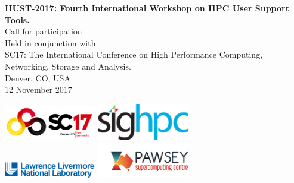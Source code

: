 \documentclass[11pt,a4paper]{article}
\begin{document}
\begin{titlepage}
\begin{center}
\vspace{35mm}
{\bf {\selectfont \fontsize{30}{35}\selectfont HUST-2017:  Fourth International Workshop on HPC User Support Tools.}}\\
\vspace{20mm}
{ {\selectfont \Huge Call for participation}}\\
\vspace{10mm}
{ {\selectfont \Huge Held in conjunction with }}\\
{ {\selectfont \Huge SC17: The International Conference on High
Performance Computing, Networking, Storage and Analysis.}}\\
\vspace{40mm}
{ {\selectfont \Huge Denver, CO, USA}}\\
{ {\selectfont \Huge 12 November 2017}}\\
\vspace{25mm}

\includegraphics[width=40mm]{../img/SC17.jpeg}
\hspace{20mm}
\includegraphics[width=40mm]{../img/sighpc-logo.png}
\\
\includegraphics[width=40mm]{../img/lab_logo_blue.png}
\hspace{10mm}
\includegraphics[width=40mm]{../img/PawseyLogoHorizontal.jpg}

\end{center}
\end{titlepage}

\lhead{}
\rhead{}
\pagestyle{fancy}
\end{document}

